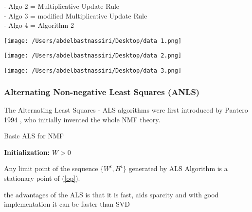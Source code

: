 \documentclass{beamer}
\begin{document}
\begin{spacing}{1.0}
\begin{frame}
        - Algo 2 = Multiplicative Update Rule\\
        - Algo 3 = modified Multiplicative Update Rule\\
        - Algo 4 = Algorithm 2
\end{frame}
\begin{frame}
    \texttt{[image: /Users/abdelbastnassiri/Desktop/data 1.png]}
\end{frame}
\begin{frame}
    \texttt{[image: /Users/abdelbastnassiri/Desktop/data 2.png]}
\end{frame}
\begin{frame}
    \texttt{[image: /Users/abdelbastnassiri/Desktop/data 3.png]}
\end{frame}
\begin{frame}
    \frametitle{Alternating Non-negative Least Squares (ANLS)}
    The Alternating Least Squares - ALS algorithms were first introduced by Paatero 1994 , 
    who initially invented the whole NMF theory.
    \begin{algorithm}[H]
        \caption{Basic ALS for NMF}
        \textbf{Initialization:} $W > 0$\;
    \end{algorithm}
\end{frame}
\begin{frame}
    \begin{theorem}
        Any limit point of the sequence $\{W^{t} , H^{t}\}$ generated by ALS Algorithm  is a stationary point of (\ref{op}).
    \end{theorem}
    the advantages of the ALS is that it is fast, aids sparcity and with good implementation it can be faster 
    than SVD    
\end{frame}
\end{spacing}
\end{document}
